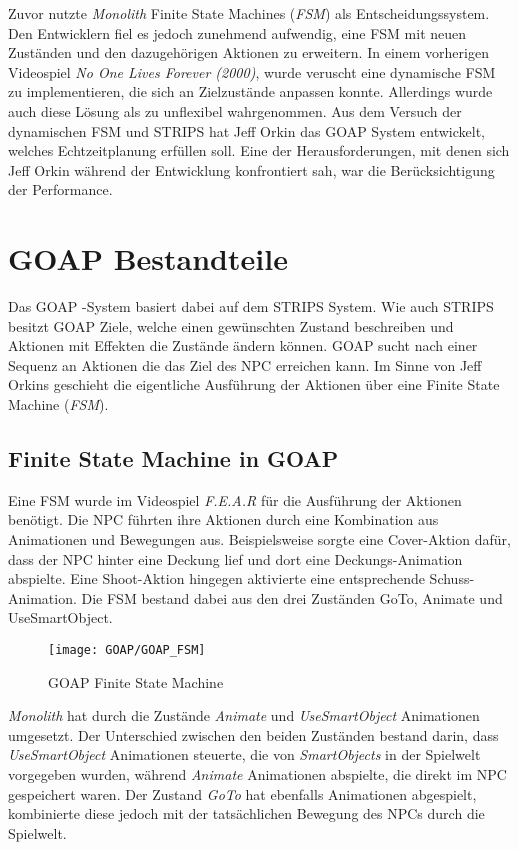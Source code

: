Zuvor nutzte \textit{Monolith} Finite State Machines (\textit{FSM}) als Entscheidungssystem. Den Entwicklern fiel es jedoch zunehmend aufwendig, eine FSM mit neuen Zuständen und den dazugehörigen Aktionen zu erweitern. In einem vorherigen Videospiel \textit{No One Lives Forever (2000)}, wurde veruscht eine dynamische FSM zu implementieren, die sich an Zielzustände anpassen konnte. Allerdings wurde auch diese Lösung als zu unflexibel wahrgenommen. Aus dem Versuch der dynamischen FSM und STRIPS hat Jeff Orkin das GOAP System entwickelt, welches Echtzeitplanung erfüllen soll. Eine der Herausforderungen, mit denen sich Jeff Orkin während der Entwicklung konfrontiert sah, war die Berücksichtigung der Performance.\autocite{retro_fear}



\section{GOAP Bestandteile}

Das GOAP -System basiert dabei auf dem STRIPS System. Wie auch STRIPS besitzt GOAP Ziele, welche einen gewünschten Zustand beschreiben und Aktionen mit Effekten die Zustände ändern können. GOAP sucht nach einer Sequenz an Aktionen die das Ziel des NPC erreichen kann. Im Sinne von Jeff Orkins geschieht die eigentliche Ausführung der Aktionen über eine Finite State Machine (\textit{FSM}).


\subsection{Finite State Machine in GOAP}

Eine FSM wurde im Videospiel \textit{F.E.A.R} für die Ausführung der Aktionen benötigt. Die NPC führten ihre Aktionen durch eine Kombination aus Animationen und Bewegungen aus. Beispielsweise sorgte eine Cover-Aktion dafür, dass der NPC hinter eine Deckung lief und dort eine Deckungs-Animation abspielte. Eine Shoot-Aktion hingegen aktivierte eine entsprechende Schuss-Animation. Die FSM bestand dabei aus den drei Zuständen GoTo, Animate und UseSmartObject. 
\begin{figure}[h]
  \centering
  \texttt{[image: GOAP/GOAP\_FSM]}
	\captionsetup{justification=justified, format=plain}
  \caption{GOAP Finite State Machine}
  \label{GOAP_FSM}
\end{figure}

\textit{Monolith} hat durch die Zustände \textit{Animate} und \textit{UseSmartObject} Animationen umgesetzt. Der Unterschied zwischen den beiden Zuständen bestand darin, dass \textit{UseSmartObject} Animationen steuerte, die von \textit{SmartObjects} in der Spielwelt vorgegeben wurden, während \textit{Animate} Animationen abspielte, die direkt im NPC gespeichert waren. Der Zustand \textit{GoTo} hat ebenfalls Animationen abgespielt, kombinierte diese jedoch mit der tatsächlichen Bewegung des NPCs durch die Spielwelt.


